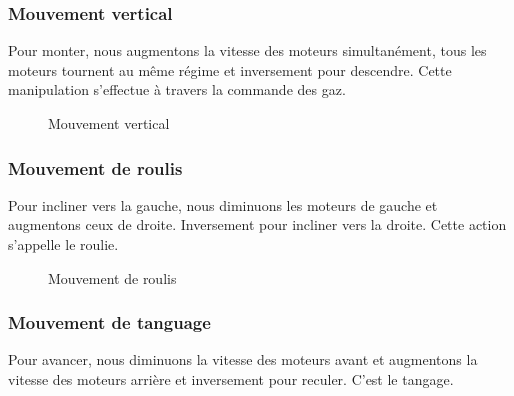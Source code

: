	
	\subsubsection{Mouvement vertical}
	Pour monter, nous augmentons la vitesse des moteurs simultanément, tous les moteurs tournent au même régime et inversement pour descendre. Cette manipulation s'effectue à travers la commande des gaz.
	\begin{figure} [H]
	\begin{center}
		\centering
	\end{center}
	\caption{Mouvement vertical}
	\end{figure}

	\subsubsection{Mouvement de roulis}
	Pour incliner vers la gauche, nous diminuons les moteurs de gauche et augmentons ceux de droite. Inversement pour incliner vers la droite. Cette action s'appelle le roulie.
	\begin{figure} [H]
	\begin{center}
	
		\caption{Mouvement de roulis}
	\end{center}
	\end{figure}
	\subsubsection{Mouvement de tanguage}
	Pour avancer, nous diminuons la vitesse des moteurs avant et augmentons la vitesse des moteurs arrière et inversement pour reculer. C'est le tangage.
	
